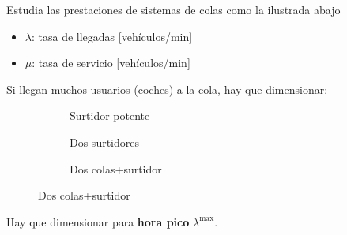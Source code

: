 \documentclass[xcolor={x11names}]{beamer}
\begin{document}
\begin{frame}{\secname}
    Estudia las prestaciones de sistemas
    de colas como la ilustrada abajo

    \begin{figure}
        
    \end{figure}

    \begin{itemize}
        \item $\lambda$: tasa de llegadas
            [vehículos/min]
        \item $\mu$: tasa de servicio
            [vehículos/min]
    \end{itemize}
\end{frame}






\begin{frame}{\secname}
    Si llegan muchos usuarios (coches)
    a la cola, hay que dimensionar:


    \begin{figure}
     \centering
     \begin{subfigure}[b]{0.3\textwidth}
         \centering
         \resizebox{\textwidth}{!}{%
         }
         \caption{Surtidor potente}
     \end{subfigure}
     \hfill
     \begin{subfigure}[b]{0.3\textwidth}
         \centering
         \resizebox{\textwidth}{!}{%
         }
         \caption{Dos surtidores}
     \end{subfigure}
     \hfill
     \begin{subfigure}[b]{0.3\textwidth}
         \centering
         \resizebox{\textwidth}{!}{%
         }
         \caption{Dos colas+surtidor}
     \end{subfigure}
    \end{figure}

\end{frame}



\begin{frame}{\secname}
    Hay que dimensionar para \textbf{hora pico}
    $\lambda^{\max}$.

    \vfill

    \begin{figure}
        
    \end{figure}
\end{frame}
\end{document}
